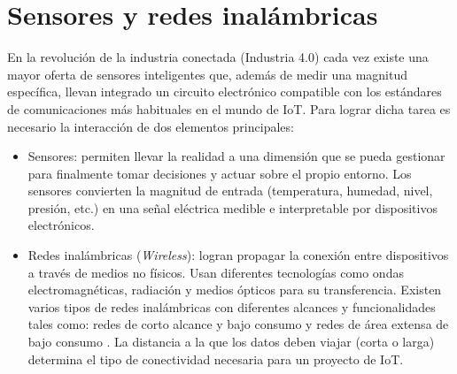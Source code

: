 \section{Sensores y redes inalámbricas}

En la revolución de la industria conectada (Industria 4.0) \citep{WEBSITE:31}  cada vez existe una mayor oferta de sensores inteligentes que, además de medir una magnitud específica, llevan integrado un circuito electrónico compatible con los estándares de comunicaciones más habituales en el mundo de IoT. Para lograr dicha tarea es necesario la interacción de dos elementos principales:

\begin{itemize}
\item Sensores: permiten llevar la realidad a una dimensión que se pueda gestionar para finalmente tomar decisiones y actuar sobre el propio entorno. Los sensores convierten la magnitud de entrada (temperatura, humedad, nivel, presión, etc.) en una señal eléctrica medible e interpretable por dispositivos electrónicos.

\item Redes inalámbricas (\emph{Wireless}): logran propagar la conexión entre dispositivos a través de medios no físicos. Usan diferentes tecnologías como ondas electromagnéticas, radiación y medios ópticos para su transferencia. Existen varios tipos de redes inalámbricas con diferentes alcances y funcionalidades tales como: redes de corto alcance y bajo consumo y redes de área extensa de bajo consumo \citep{WEBSITE:15}. La distancia a la que los datos deben viajar (corta o larga) determina el tipo de conectividad necesaria para un proyecto de IoT.

\end{itemize}





